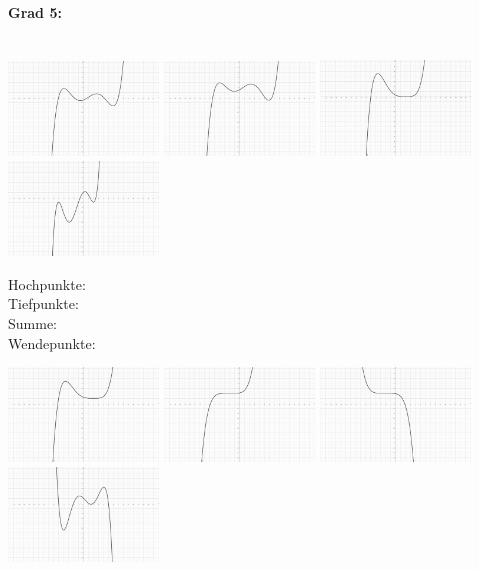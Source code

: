 \documentclass[12pt, parskip=half, a4paper, oneside]{scrartcl}
\begin{document}
\paragraph{Grad 5:}\textcolor{white}{.}\\
\includegraphics[width=4cm]{Bilder/G51}\hfill
\includegraphics[width=4cm]{Bilder/G52}\hfill
\includegraphics[width=4cm]{Bilder/G53}\hfill
\includegraphics[width=4cm]{Bilder/G54}

\begin{addmargin}[-2cm]{0pt}
Hochpunkte: \\
Tiefpunkte: \\
Summe: \\
Wendepunkte:
\end{addmargin}

\includegraphics[width=4cm]{Bilder/G55}\hfill
\includegraphics[width=4cm]{Bilder/G56}\hfill
\includegraphics[width=4cm]{Bilder/G57}\hfill
\includegraphics[width=4cm]{Bilder/G58}
\end{document}
